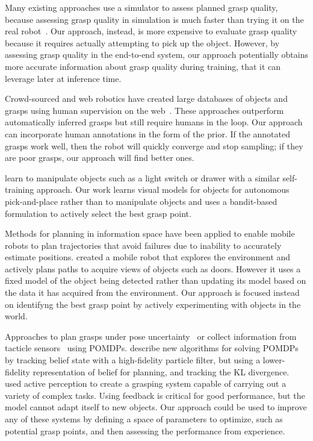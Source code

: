 \documentclass{article}
\begin{document}
Many existing approaches use a simulator to assess planned grasp
quality, because assessing grasp quality in simulation is much faster
than trying it on the real robot~\citet{miller04}.  Our approach,
instead, is more expensive to evaluate grasp quality because it
requires actually attempting to pick up the object.  However, by
assessing grasp quality in the end-to-end system, our approach
potentially obtains more accurate information about grasp quality
during training, that it can leverage later at inference time.


Crowd-sourced and web robotics have created large databases of objects
and grasps using human supervision on the web~\citep{kent14a, kent14}.
These approaches outperform automatically inferred grasps but still
require humans in the loop.  Our approach can incorporate human
annotations in the form of the prior.  If the annotated grasps work
well, then the robot will quickly converge and stop sampling; if they
are poor grasps, our approach will find better ones.


\citet{nguyen14} learn to manipulate objects such as a light switch or
drawer with a similar self-training approach.  Our work learns visual
models for objects for autonomous pick-and-place rather than to
manipulate objects and uses a bandit-based formulation to actively
select the best grasp point.


Methods for planning in information space \citep{he08, atanasov13,
  prentice09} have been applied to enable mobile robots to plan
trajectories that avoid failures due to inability to accurately
estimate positions.  \citet{velez11} created a mobile robot that
explores the environment and actively plans paths to acquire views of
objects such as doors.  However it uses a fixed model of the object
being detected rather than updating its model based on the data it has
acquired from the environment.  Our approach is focused instead on
identifyng the best grasp point by actively experimenting with objects
in the world.

Approaches to plan grasps under pose uncertainty~\citep{stulp11} or
collect information from tacticle sensors~\citep{hsiao10} using
POMDPs.  \citet{platt11} describe new algorithms for solving POMDPs by
tracking belief state with a high-fidelity particle filter, but using
a lower-fidelity representation of belief for planning, and tracking
the KL divergence.  \citet{hudson12} used active perception to create
a grasping system capable of carrying out a variety of complex tasks.
Using feedback is critical for good performance, but the model cannot
adapt itself to new objects.  Our approach could be used to improve
any of these systems by defining a space of parameters to optimize,
such as potential grasp points, and then assessing the performance
from experience.
\end{document}
